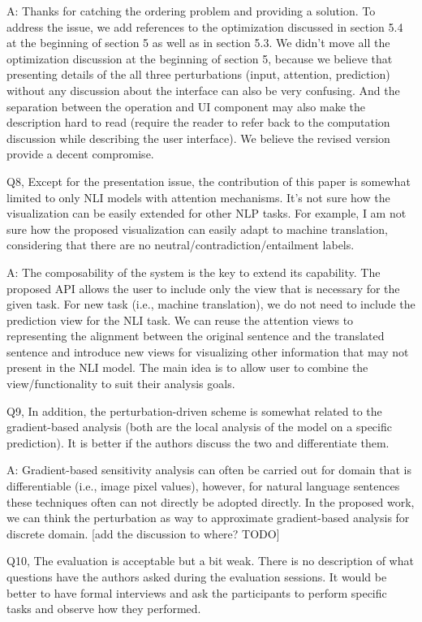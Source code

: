A: Thanks for catching the ordering problem and providing a solution. To address the issue, we add references to the optimization discussed in section 5.4 at the beginning of section 5 as well as in section 5.3. We didn't move all the optimization discussion at the beginning of section 5, because we believe that presenting details of the all three perturbations (input, attention, prediction) without any discussion about the interface can also be very confusing. And the separation between the operation and UI component may also make the description hard to read (require the reader to refer back to the computation discussion while describing the user interface). We believe the revised version provide a decent compromise.

Q8, Except for the presentation issue, the contribution of this paper is somewhat limited to only NLI models with attention mechanisms. It's not sure how the visualization can be easily extended for other NLP tasks. For example, I am not sure how the proposed visualization can easily adapt to machine translation, considering that there are no neutral/contradiction/entailment labels.

A: The composability of the system is the key to extend its capability. The proposed API allows the user to include only the view that is necessary for the given task. For new task (i.e., machine translation), we do not need to include the prediction view for the NLI task. We can reuse the attention views to representing the alignment between the original sentence and the translated sentence and introduce new views for visualizing other information that may not present in the NLI model. The main idea is to allow user to combine the view/functionality to suit their analysis goals.

Q9, In addition, the perturbation-driven scheme is somewhat related to the gradient-based analysis (both are the local analysis of the model on a specific prediction). It is better if the authors discuss the two and differentiate them.

A: Gradient-based sensitivity analysis can often be carried out for domain that is differentiable (i.e., image pixel values), however, for natural language sentences these techniques often can not directly be adopted directly. In the proposed work, we can think the perturbation as way to approximate gradient-based analysis for discrete domain. [add the discussion to where? TODO]

Q10, The evaluation is acceptable but a bit weak. There is no description of what questions have the authors asked during the evaluation sessions. It would be better to have formal interviews and ask the participants to perform specific tasks and observe how they performed.

